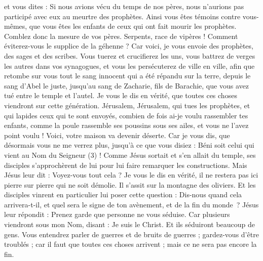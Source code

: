 \begin{multicols}{2}
{et vous dites : Si nous avions vécu du temps de nos pères, nous n'aurions pas participé avec eux au meurtre des prophètes.
Ainsi vous êtes témoins contre vous-mêmes, que vous êtes les enfants de ceux qui ont fait mourir les prophètes.
Comblez donc la mesure de vos pères.
Serpents, race de vipères ! Comment éviterez-vous le supplice de la géhenne ?
Car voici, je vous envoie des prophètes, des sages et des scribes. Vous tuerez et crucifierez les uns, vous battrez de verges les autres dans vos synagogues, et vous les persécuterez de ville en ville,
afin que retombe sur vous tout le sang innocent qui a été répandu sur la terre, depuis le sang d'Abel le juste, jusqu’au sang de Zacharie, fils de Barachie, que vous avez tué entre le temple et l'autel.
Je vous le dis en vérité, que toutes ces choses viendront sur cette génération.
Jérusalem, Jérusalem, qui tues les prophètes, et qui lapides ceux qui te sont envoyés, combien de fois ai-je voulu rassembler tes enfants, comme la poule rassemble ses poussins sous ses ailes, et vous ne l'avez point voulu !
Voici, votre maison va devenir déserte.
Car je vous dis, que désormais vous ne me verrez plus, jusqu'à ce que vous disiez : Béni soit celui qui vient au Nom du Seigneur (3) !
\VerseOne{}Comme Jésus sortait et s'en allait du temple, ses disciples s'approchèrent de lui pour lui faire remarquer les constructions.
Mais Jésus leur dit : Voyez-vous tout cela ? Je vous le dis en vérité, il ne restera pas ici pierre sur pierre qui ne soit démolie.
Il s’assit sur la montagne des oliviers. Et les disciples vinrent en particulier lui poser cette question : Dis-nous quand cela arrivera-t-il, et quel sera le signe de ton avènement, et de la fin du monde ?
Jésus leur répondit : Prenez garde que personne ne vous séduise.
Car plusieurs viendront sous mon Nom, disant : Je suis le Christ. Et ils séduiront beaucoup de gens.
Vous entendrez parler de guerres et de bruits de guerres ; gardez-vous d’être troublés ; car il faut que toutes ces choses arrivent ; mais ce ne sera pas encore la fin.
}
\end{multicols}
